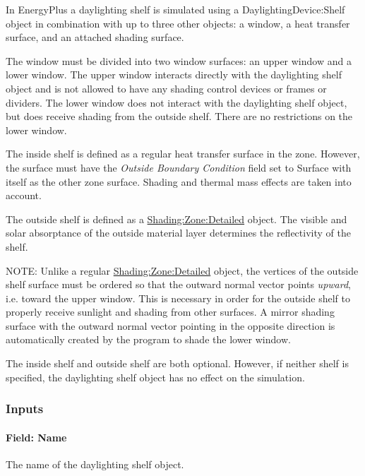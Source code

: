 In EnergyPlus a daylighting shelf is simulated using a DaylightingDevice:Shelf object in combination with up to three other objects: a window, a heat transfer surface, and an attached shading surface.

The window must be divided into two window surfaces: an upper window and a lower window. The upper window interacts directly with the daylighting shelf object and is not allowed to have any shading control devices or frames or dividers. The lower window does not interact with the daylighting shelf object, but does receive shading from the outside shelf. There are no restrictions on the lower window.

The inside shelf is defined as a regular heat transfer surface in the zone. However, the surface must have the \emph{Outside Boundary Condition} field set to Surface with itself as the other zone surface. Shading and thermal mass effects are taken into account.

The outside shelf is defined as a \hyperref[shadingzonedetailed-000]{Shading:Zone:Detailed} object. The visible and solar absorptance of the outside material layer determines the reflectivity of the shelf.

\begin{callout}
  NOTE: Unlike a regular \hyperref[shadingzonedetailed-000]{Shading:Zone:Detailed} object, the vertices of the outside shelf surface must be ordered so that the outward normal vector points \emph{upward}, i.e. toward the upper window. This is necessary in order for the outside shelf to properly receive sunlight and shading from other surfaces. A mirror shading surface with the outward normal vector pointing in the opposite direction is automatically created by the program to shade the lower window.
\end{callout}

The inside shelf and outside shelf are both optional. However, if neither shelf is specified, the daylighting shelf object has no effect on the simulation.

\subsubsection{Inputs}\label{inputs-7-005}

\paragraph{Field: Name}\label{field-name-4-006}

The name of the daylighting shelf object.

